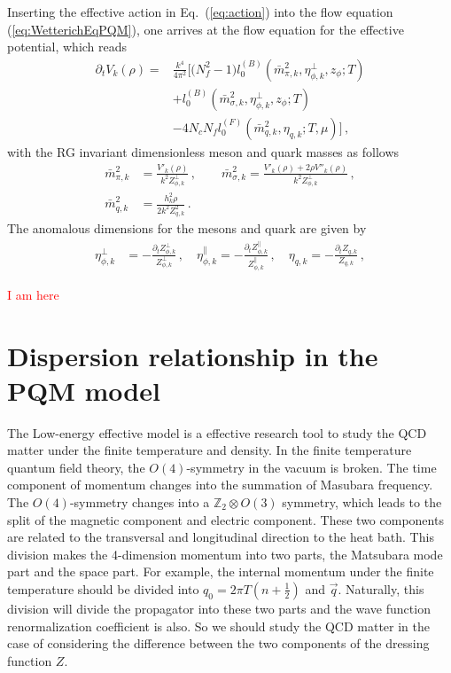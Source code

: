 \documentclass[%
reprint,
superscriptaddress,
showpacs,preprintnumbers,
 amsmath,amssymb,
 aps,
prd,
]{revtex4-1}
\def\Eq#1{Eq.~(\ref{#1})}
\def\eq#1{(\ref{#1})}
\newcommand{\colwjf}[1]{\textcolor{red}{#1}}
\begin{document}
Inserting the effective action in \Eq{eq:action} into the flow equation \eq{eq:WetterichEqPQM}, one arrives at the flow equation for the effective potential, which reads
\begin{align}
  \partial_t V_k(\rho)=&\frac{k^4}{4\pi^2} \bigg [\big(N^2_f-1\big) l^{(B)}_{0}(\bar{m}^{2}_{\pi,k},\eta^{\perp}_{\phi,k},z_\phi;T)\nonumber\\[2ex]
&+l^{(B)}_{0}(\bar{m}^{2}_{\sigma,k},\eta^{\perp}_{\phi,k},z_\phi;T)\nonumber\\[2ex]
&-4N_cN_fl^{(F)}_{0}(\bar{m}^{2}_{q,k},\eta_{q,k};T,\mu)\bigg]\,,
\end{align}
with the RG invariant dimensionless meson and quark masses as follows
\begin{align}
  \bar{m}^{2}_{\pi,k}&=\frac{V'_k(\rho)}{k^2Z^{\perp}_{\phi,k}}\,, \qquad \bar{m}^{2}_{\sigma,k}=\frac{V'_k(\rho)+2\rho V''_k(\rho)}{k^2 Z^{\perp}_{\phi,k}}\,,\\[2ex]
  \bar{m}^{2}_{q,k}&=\frac{h^{2}_{k}\rho}{2k^2Z^{2}_{q,k}}\,.
\end{align}
The anomalous dimensions for the mesons and quark are given by
\begin{align}
  \eta_{\phi,k}^{\perp}&=-\frac{\partial_t Z_{\phi,k}^{\perp}}{Z_{\phi,k}^{\perp}}\,,\quad \eta_{\phi,k}^{\parallel}=-\frac{\partial_t Z_{\phi,k}^{\parallel}}
{Z_{\phi,k}^{\parallel}}\,,\quad \eta_{q,k}=-\frac{\partial_t Z_{q,k}}{Z_{q,k}}\,, \label{}
\end{align}



\colwjf{I am here}
















\section{Dispersion relationship in the PQM model}
\label{sec:}

The Low-energy effective model is a effective research tool to study the QCD matter under the finite temperature and density. In the 
finite temperature quantum field theory, the $O(4)$-symmetry in the vacuum is broken. The time component of momentum changes into the 
summation of Masubara frequency. The $O(4)$-symmetry changes into a 
$\mathbb{Z}_2\otimes O(3)$ symmetry, which leads to the split of the magnetic component and electric component. These two 
components are related to the transversal and longitudinal direction to the heat bath. This division makes the 4-dimension momentum
into two parts, the Matsubara mode part and the space part. For example, the internal momentum under the finite temperature should 
be divided into $q_0=2\pi T(n+\frac{1}{2})$ and $\vec{q}$. Naturally, this division will divide the propagator into these two parts and 
the wave function renormalization coefficient is also. So we should study the QCD matter in the case of considering the difference 
between the two components of the dressing function $Z$. \par
\end{document}
